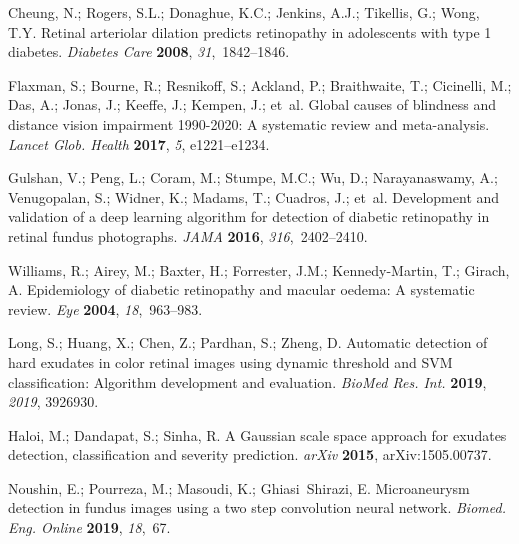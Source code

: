 \documentclass[electronics,article,accept ,moreauthors,pdftex]{mdpi}
\begin{document}
\begin{thebibliography}{999}

Cheung, N.; Rogers, S.L.; Donaghue, K.C.; Jenkins, A.J.; Tikellis, G.; Wong,
 T.Y.
Retinal arteriolar dilation predicts retinopathy in adolescents with
 type 1 diabetes.
{\em Diabetes Care} {\bf 2008}, {\em 31},~1842--1846.

Flaxman, S.; Bourne, R.; Resnikoff, S.; Ackland, P.; Braithwaite, T.;
 Cicinelli, M.; Das, A.; Jonas, J.; Keeffe, J.; Kempen, J.; et~al.
Global causes of blindness and distance vision impairment 1990-2020:
 A systematic review and meta-analysis. 
 \emph{Lancet Glob. Health} \textbf{2017}, \emph{5}, e1221--e1234.

Gulshan, V.; Peng, L.; Coram, M.; Stumpe, M.C.; Wu, D.; Narayanaswamy, A.;
 Venugopalan, S.; Widner, K.; Madams, T.; Cuadros, J.; et~al.
Development and validation of a deep learning algorithm for detection
 of diabetic retinopathy in retinal fundus photographs.
{\em JAMA} {\bf 2016}, {\em 316},~2402--2410.

Williams, R.; Airey, M.; Baxter, H.; Forrester, J.M.; Kennedy-Martin, T.;
 Girach, A.
Epidemiology of diabetic retinopathy and macular oedema: A systematic
 review.
{\em Eye} {\bf 2004}, {\em 18},~963--983.

Long, S.; Huang, X.; Chen, Z.; Pardhan, S.; Zheng, D.
Automatic detection of hard exudates in color retinal images using
 dynamic threshold and SVM classification: Algorithm development and
 evaluation.
{\em BioMed Res. Int.} {\bf 2019}, {\em 2019}, 3926930.

Haloi, M.; Dandapat, S.; Sinha, R.
A Gaussian scale space approach for exudates detection,
 classification and severity prediction.
{\em arXiv} {\bf 2015}, arXiv:1505.00737.

Noushin, E.; Pourreza, M.; Masoudi, K.; Ghiasi~Shirazi, E.
Microaneurysm detection in fundus images using a two step convolution
 neural network.
{\em Biomed. Eng. Online} {\bf 2019}, {\em 18},~67.


\end{thebibliography}
\end{document}
